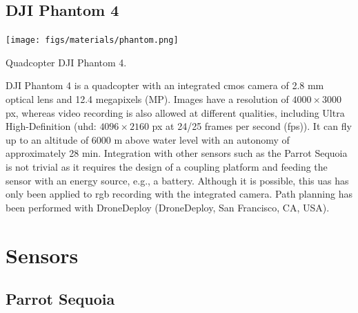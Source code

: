 \subsection{DJI Phantom 4}

\begin{marginfigure}[.1cm]
	\texttt{[image: figs/materials/phantom.png]}
	\caption{Quadcopter DJI Phantom 4.}
	\label{fig:dji_phantom4}
\end{marginfigure}
DJI Phantom 4 is a quadcopter with an integrated \acrshort{cmos} camera of 2.8 \si{\milli\meter} optical lens and 12.4 megapixels (MP). Images have a resolution of $4000 \times 3000$ px, whereas video recording is also allowed at different qualities, including Ultra High-Definition (\acrshort{uhd}: $4096 \times 2160$ px at 24/25 frames per second (\acrshort{fps})). It can fly up to an altitude of 6000 \si{\meter} above water level with an autonomy of approximately 28 \si{\minute}. Integration with other sensors such as the Parrot Sequoia is not trivial as it requires the design of a coupling platform and feeding the sensor with an energy source, e.g., a battery. Although it is possible, this \acrshort{uas} has only been applied to \acrshort{rgb} recording with the integrated camera. Path planning has been performed with DroneDeploy (DroneDeploy, San Francisco, CA, USA).

\section{Sensors}

\subsection{Parrot Sequoia}

